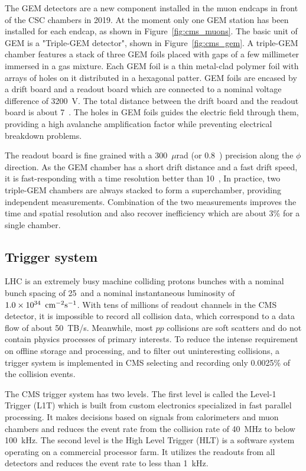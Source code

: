 The GEM detectors are a new component installed in the muon endcaps in front of the CSC chambers in 2019.
At the moment only one GEM station has been installed for each endcap, as shown in Figure~\ref{fig:cms_muons}.
The basic unit of GEM is a "Triple-GEM detector", shown in Figure~\ref{fig:cms_gem}.
A triple-GEM chamber features a stack of three GEM foils placed with gaps of a few millimeter immersed in a gas mixture.
Each GEM foil is a thin metal-clad polymer foil with arrays of holes on it distributed in a hexagonal patter. 
GEM foils are encased by a drift board and a readout board which are connected to a nominal voltage difference of 3200~V.
The total distance between the drift board and the readout board is about 7~\mm.
The holes in GEM foils guides the electric field through them, providing a high avalanche amplification factor while preventing electrical breakdown problems.

The readout board is fine grained with a 300~$\mu$rad (or 0.8~\mm) precision along the $\phi$ direction.
As the GEM chamber has a short drift distance and a fast drift speed, it is fast-responding with a time resolution better than 10~\ns, 
In practice, two triple-GEM chambers are always stacked to form a superchamber, providing independent measurements.
Combination of the two measurements improves the time and spatial resolution and also recover inefficiency which are about 3\% for a single chamber.

\subsection{Trigger system}\label{sec:trigger}

LHC is an extremely busy machine colliding protons bunches with a nominal bunch spacing of 25~\ns and a nominal instantaneous luminosity of $1.0 \times 10^{34}~\,\text{cm}^{-2}\text{s}^{-1}$. 
With tens of millions of readout channels in the CMS detector, it is impossible to record all collision data, which correspond to a data flow of about 50~TB/s. 
Meanwhile, most $pp$ collisions are soft scatters and do not contain physics processes of primary interests.
To reduce the intense requirement on offline storage and processing, and to filter out uninteresting collisions,
a trigger system is implemented in CMS selecting and recording only 0.0025\% of the collision events.

The CMS trigger system has two levels. 
The first level is called the Level-1 Trigger (L1T) which is built from custom electronics specialized in fast parallel processing.
It makes decisions based on signals from calorimeters and muon chambers and reduces the event rate from the collision rate of 40~MHz to below 100~kHz.
The second level is the High Level Trigger (HLT) is a software system operating on a commercial processor farm.
It utilizes the readouts from all detectors and reduces the event rate to less than 1~kHz. 

